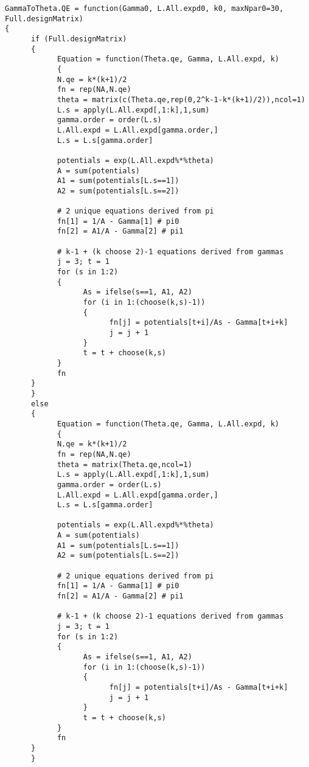 \documentclass[11 pt, a4paper]{article}  %
\begin{document}
\begin{verbatim}
GammaToTheta.QE = function(Gamma0, L.All.expd0, k0, maxNpar0=30, Full.designMatrix)
{
      if (Full.designMatrix)
      {
            Equation = function(Theta.qe, Gamma, L.All.expd, k)
            {
            N.qe = k*(k+1)/2
            fn = rep(NA,N.qe)
            theta = matrix(c(Theta.qe,rep(0,2^k-1-k*(k+1)/2)),ncol=1)
            L.s = apply(L.All.expd[,1:k],1,sum)
            gamma.order = order(L.s)
            L.All.expd = L.All.expd[gamma.order,]
            L.s = L.s[gamma.order]
            
            potentials = exp(L.All.expd%*%theta)
            A = sum(potentials)
            A1 = sum(potentials[L.s==1])
            A2 = sum(potentials[L.s==2])
            
            # 2 unique equations derived from pi
            fn[1] = 1/A - Gamma[1] # pi0
            fn[2] = A1/A - Gamma[2] # pi1  
            
            # k-1 + (k choose 2)-1 equations derived from gammas
            j = 3; t = 1
            for (s in 1:2)
            {
                  As = ifelse(s==1, A1, A2)
                  for (i in 1:(choose(k,s)-1))
                  {
                        fn[j] = potentials[t+i]/As - Gamma[t+i+k]
                        j = j + 1
                  }
                  t = t + choose(k,s)
            }
            fn
      }
      }
      else
      {
            Equation = function(Theta.qe, Gamma, L.All.expd, k)
            {
            N.qe = k*(k+1)/2
            fn = rep(NA,N.qe)
            theta = matrix(Theta.qe,ncol=1)
            L.s = apply(L.All.expd[,1:k],1,sum)
            gamma.order = order(L.s)
            L.All.expd = L.All.expd[gamma.order,]
            L.s = L.s[gamma.order]
            
            potentials = exp(L.All.expd%*%theta)
            A = sum(potentials)
            A1 = sum(potentials[L.s==1])
            A2 = sum(potentials[L.s==2])
            
            # 2 unique equations derived from pi
            fn[1] = 1/A - Gamma[1] # pi0
            fn[2] = A1/A - Gamma[2] # pi1  
            
            # k-1 + (k choose 2)-1 equations derived from gammas
            j = 3; t = 1
            for (s in 1:2)
            {
                  As = ifelse(s==1, A1, A2)
                  for (i in 1:(choose(k,s)-1))
                  {
                        fn[j] = potentials[t+i]/As - Gamma[t+i+k]
                        j = j + 1
                  }
                  t = t + choose(k,s)
            }
            fn
      }
      }
      

\end{verbatim}
\end{document}
